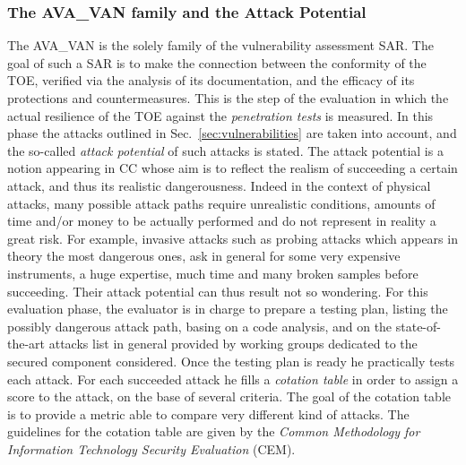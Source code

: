 \subsubsection{The AVA\_VAN family and the Attack Potential}
The AVA\_VAN is the solely family of the vulnerability assessment SAR. The goal of such a SAR is to make the connection between the conformity of the TOE, verified via the analysis of its documentation, and the efficacy of its protections and countermeasures. This is the step of the evaluation in which the actual resilience of the TOE against the \emph{penetration tests} is measured. In this phase the attacks outlined in Sec.~\ref{sec:vulnerabilities} are taken into account, and the so-called \emph{attack potential} of such attacks is stated. The attack potential is a notion appearing in CC whose aim is to reflect the realism of succeeding a certain attack, and thus its realistic dangerousness. Indeed in the context of physical attacks, many possible attack paths require unrealistic conditions, amounts of time and/or money to be actually performed and do not represent in reality a great risk. For example, invasive attacks such as probing attacks which appears in theory the most dangerous ones, ask in general for some very expensive instruments, a huge expertise, much time and many broken samples before succeeding. Their attack potential can thus result not so wondering. For this evaluation phase, the evaluator is in charge to prepare a testing plan, listing the possibly dangerous attack path, basing on a code analysis, and on the state-of-the-art attacks list in general provided by working groups dedicated to the secured component considered. Once the testing plan is ready he practically tests each attack. For each succeeded attack he fills a \emph{cotation table} in order to assign a score to the attack, on the base of several criteria. The goal of the cotation table is to provide a metric able to compare very different kind of attacks. The guidelines for the cotation table are given by the \emph{Common Methodology for Information Technology Security Evaluation} (CEM). \\

